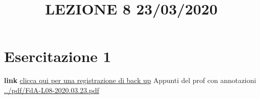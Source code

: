 \section{Esercitazione 1}
\title{LEZIONE 8 23/03/2020}\newline
\textbf{link} \href{https://onedrive.live.com/?authkey=%21AATVJK3srNwxGzs&id=EE092FF4FF7B5B0E%212158&cid=EE092FF4FF7B5B0E}{clicca qui per una registrazione di back up}\newline
\newline
Appunti del prof con annotazioni \url{../pdf/FdA-L08-2020.03.23.pdf}